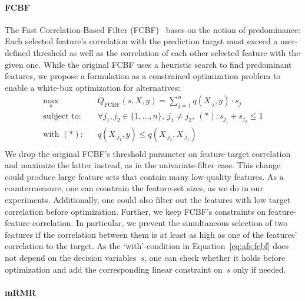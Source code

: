 \documentclass{article}
\theoremstyle{definition}
\begin{document}
\paragraph{FCBF}

The Fast Correlation-Based Filter (FCBF)~\cite{yu2003feature} bases on the notion of predominance:
Each selected feature's correlation with the prediction target must exceed a user-defined threshold as well as the correlation of each other selected feature with the given one.
While the original FCBF uses a heuristic search to find predominant features, we propose a formulation as a constrained optimization problem to enable a white-box optimization for alternatives:
%
\begin{equation}
	\begin{aligned}
		\max_s &\quad Q_{\text{FCBF}}(s,X,y) = \sum_{j=1}^{n} q(X_{\cdot{}j},y) \cdot s_j \\
		\text{subject to:} &\quad \forall j_1, j_2 \in \{1, \dots, n\},~j_1 \neq j_2,~(*): s_{j_1} + s_{j_2} \leq 1 \\
		\text{with } (*) \text{:} &\quad q(X_{\cdot{}j_1},y) \leq q(X_{\cdot{}j_2}, X_{\cdot{}j_1}) \\
	\end{aligned}
	\label{eq:afs:fcbf}
\end{equation}
%
We drop the original FCBF's threshold parameter on feature-target correlation and maximize the latter instead, as in the univariate-filter case.
This change could produce large feature sets that contain many low-quality features.
As a countermeasure, one can constrain the feature-set sizes, as we do in our experiments.
Additionally, one could also filter out the features with low target correlation before optimization.
Further, we keep FCBF's constraints on feature-feature correlation.
In particular, we prevent the simultaneous selection of two features if the correlation between them is at least as high as one of the features' correlation to the target.
As the `with'-condition in Equation~\ref{eq:afs:fcbf} does not depend on the decision variables~$s$, one can check whether it holds before optimization and add the corresponding linear constraint on~$s$ only if needed.

\paragraph{mRMR}
\end{document}
